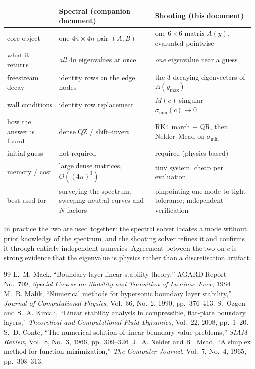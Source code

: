 \documentclass[11pt]{article}
\begin{document}
\begin{center}\small
\renewcommand{\arraystretch}{1.28}
\begin{tabular}{@{}>{\raggedright\arraybackslash}p{3.0cm}>{\raggedright\arraybackslash}p{5.2cm}>{\raggedright\arraybackslash}p{5.2cm}@{}}
\toprule
 & \textbf{Spectral (companion document)} & \textbf{Shooting (this document)} \\
\midrule
core object & one $4n\times4n$ pair $(A,B)$ & one $6\times6$ matrix $A(y)$, evaluated pointwise \\
what it returns & \emph{all} $4n$ eigenvalues at once & \emph{one} eigenvalue near a guess \\
freestream decay & identity rows on the edge nodes & the 3 decaying eigenvectors of $A(y_{\max})$ \\
wall conditions & identity row replacement & $M(c)$ singular, $\sigma_{\min}(c)\to0$ \\
how the answer is found & dense QZ / shift--invert & RK4 march $+$ QR, then Nelder--Mead on $\sigma_{\min}$ \\
initial guess & not required & required (physics-based) \\
memory / cost & large dense matrices, $O((4n)^3)$ & tiny system, cheap per evaluation \\
best used for & surveying the spectrum; sweeping neutral curves and $N$-factors & pinpointing one mode to tight tolerance; independent verification \\
\bottomrule
\end{tabular}
\end{center}

\noindent In practice the two are used together: the spectral solver locates a mode without prior
knowledge of the spectrum, and the shooting solver refines it and confirms it through entirely
independent numerics. Agreement between the two on $c$ is strong evidence that the eigenvalue is
physics rather than a discretisation artifact.

\begin{thebibliography}{99}
 L.~M. Mack, ``Boundary-layer linear stability theory,'' AGARD Report No.~709,
  \emph{Special Course on Stability and Transition of Laminar Flow}, 1984.
 M.~R. Malik, ``Numerical methods for hypersonic boundary layer stability,''
  \emph{Journal of Computational Physics}, Vol.~86, No.~2, 1990, pp.~376--413.
 S.~\"Ozgen and S.~A. K{\i}rcal{\i}, ``Linear stability analysis in compressible,
  flat-plate boundary layers,'' \emph{Theoretical and Computational Fluid Dynamics}, Vol.~22, 2008,
  pp.~1--20.
 S.~D. Conte, ``The numerical solution of linear boundary value problems,''
  \emph{SIAM Review}, Vol.~8, No.~3, 1966, pp.~309--326.
 J.~A. Nelder and R.~Mead, ``A simplex method for function minimization,''
  \emph{The Computer Journal}, Vol.~7, No.~4, 1965, pp.~308--313.
\end{thebibliography}
\end{document}
